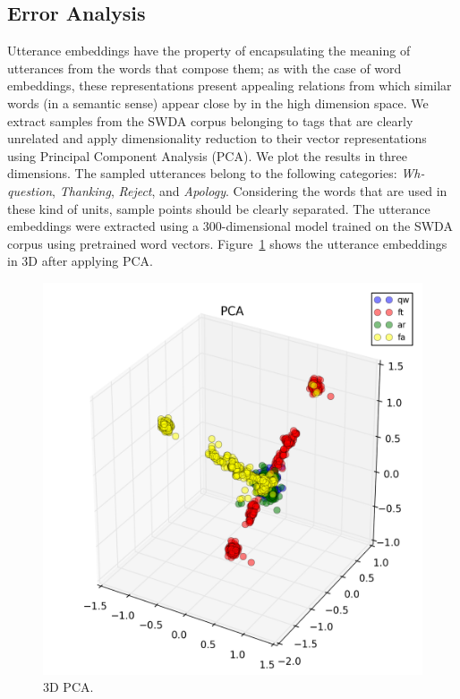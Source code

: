 \subsection{Error Analysis}
Utterance embeddings have the property of encapsulating the meaning of utterances from the words that compose them; as with the case of word embeddings, these representations present appealing relations from which similar words (in a semantic sense) appear close by in the high dimension space.
We extract samples from the SWDA corpus belonging to tags that are clearly unrelated and apply dimensionality reduction to their vector representations using Principal Component Analysis (PCA).
We plot the results in three dimensions.
The sampled utterances belong to the following categories: \emph{Wh-question}, \emph{Thanking}, \emph{Reject}, and \emph{Apology}.
Considering the words that are used in these kind of units, sample points should be clearly separated.
The utterance embeddings were extracted using a 300-dimensional model trained on the SWDA corpus using pretrained word vectors.
Figure~\ref{fig:4cat_3d_pca} shows the utterance embeddings in 3D after applying PCA.

\begin{figure}
\centering
\includegraphics[width=\columnwidth]{img/easy_pca_3d}
\caption{3D PCA.}
\label{fig:4cat_3d_pca}
\end{figure}

